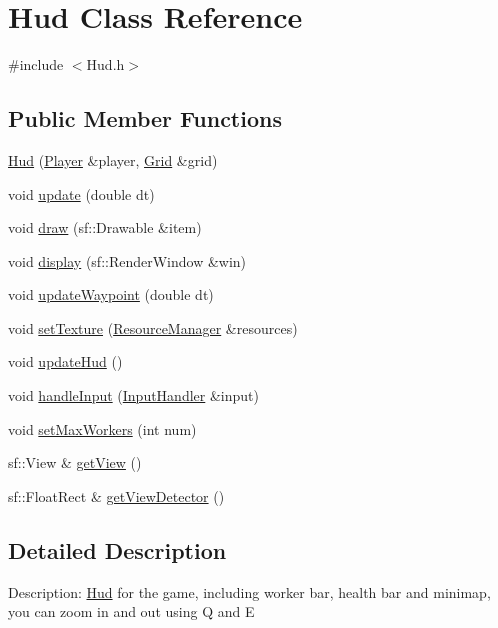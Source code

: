 \hypertarget{class_hud}{}\section{Hud Class Reference}
\label{class_hud}


{\ttfamily \#include $<$Hud.\+h$>$}

\subsection*{Public Member Functions}
\begin{DoxyCompactItemize}
\item 
\mbox{\hyperlink{class_hud_a473653a9ce3114aa55b48acf77294899}{Hud}} (\mbox{\hyperlink{class_player}{Player}} \&player, \mbox{\hyperlink{class_grid}{Grid}} \&grid)
\item 
void \mbox{\hyperlink{class_hud_aac69f76ed8b4e7966753fa16541a46a2}{update}} (double dt)
\item 
void \mbox{\hyperlink{class_hud_a2328332d9175e59b8f3c6db45438ad07}{draw}} (sf\+::\+Drawable \&item)
\item 
void \mbox{\hyperlink{class_hud_aec596c1aa18c05aed1c36144698de4bf}{display}} (sf\+::\+Render\+Window \&win)
\item 
void \mbox{\hyperlink{class_hud_a55f8809879eb36adb46193a8fa555f9f}{update\+Waypoint}} (double dt)
\item 
void \mbox{\hyperlink{class_hud_a0c4185aae3d86c96a1f963cfa5f6a119}{set\+Texture}} (\mbox{\hyperlink{class_resource_manager}{Resource\+Manager}} \&resources)
\item 
void \mbox{\hyperlink{class_hud_a879a878942dd2bcd839242ef9f46704a}{update\+Hud}} ()
\item 
void \mbox{\hyperlink{class_hud_a68616386d3e44eef176ec9cfa4e68dbe}{handle\+Input}} (\mbox{\hyperlink{class_input_handler}{Input\+Handler}} \&input)
\item 
void \mbox{\hyperlink{class_hud_a92f4216b26f6d20c62e9a89376b72717}{set\+Max\+Workers}} (int num)
\item 
sf\+::\+View \& \mbox{\hyperlink{class_hud_a3dbe2361eec00c3b2834351e4dbe6b1d}{get\+View}} ()
\item 
sf\+::\+Float\+Rect \& \mbox{\hyperlink{class_hud_a4b838665eb682780fbec8602871ef611}{get\+View\+Detector}} ()
\end{DoxyCompactItemize}


\subsection{Detailed Description}
Description\+: \mbox{\hyperlink{class_hud}{Hud}} for the game, including worker bar, health bar and minimap, you can zoom in and out using Q and E 

